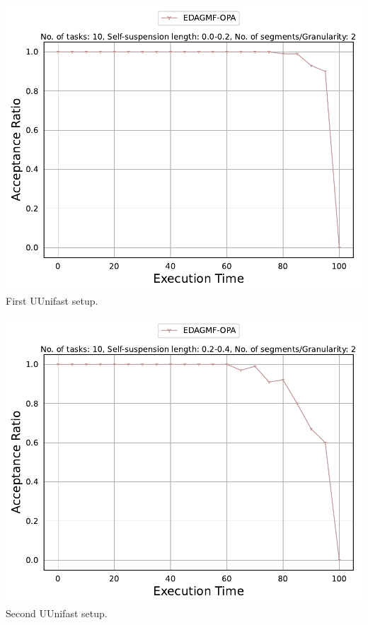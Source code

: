 \documentclass[]{article}
\begin{document}
	\begin{minipage}[t]{0.48\linewidth}
		\vspace{0.3cm}
		
		\includegraphics[width=\linewidth]{EDAGMF-OPA[2][0.0-0.2][10].pdf}
		First UUnifast setup.
		\vspace{0.3cm}
		
		\includegraphics[width=\linewidth]{EDAGMF-OPA[2][0.2-0.4][10].pdf}
		Second UUnifast setup.
		\vspace{0.3cm}


\end{minipage}
\end{document}
